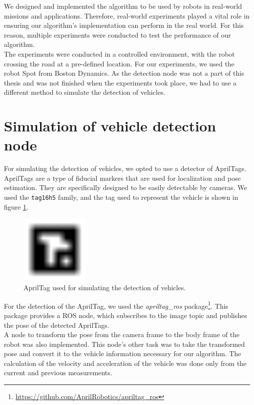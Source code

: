 We designed and implemented the algorithm to be used by robots in real-world missions and applications. Therefore, real-world experiments played a vital role in ensuring our algorithm's implementation can perform in the real world. For this reason, multiple experiments were conducted to test the performance of our algorithm.\\
The experiments were conducted in a controlled environment, with the robot crossing the road at a pre-defined location. For our experiments, we used the robot Spot from Boston Dynamics. As the detection node was not a part of this thesis and was not finished when the experiments took place, we had to use a different method to simulate the detection of vehicles.

\section{Simulation of vehicle detection node}
    For simulating the detection of vehicles, we opted to use a detector of AprilTags. AprilTags are a type of fiducial markers that are used for localization and pose estimation. They are specifically designed to be easily detectable by cameras. We used the \texttt{tag16h5} family, and the tag used to represent the vehicle is shown in figure \ref{fig:apriltag}.\\
    \begin{figure}[ht]
        \centering
        \includegraphics[trim={1 1 1 1}, clip, width=0.3\textwidth]{images/tag16_05_00007.png}
        \caption{AprilTag used for simulating the detection of vehicles.}
        \label{fig:apriltag}
    \end{figure}
    For the detection of the AprilTag, we used the \textit{apriltag\_ros} package\footnote{\url{https://github.com/AprilRobotics/apriltag_ros}}. This package provides a ROS node, which subscribes to the image topic and publishes the pose of the detected AprilTags.\\
    A node to transform the pose from the camera frame to the body frame of the robot was also implemented. This node's other task was to take the transformed pose and convert it to the vehicle information necessary for our algorithm. The calculation of the velocity and acceleration of the vehicle was done only from the current and previous measurements.

